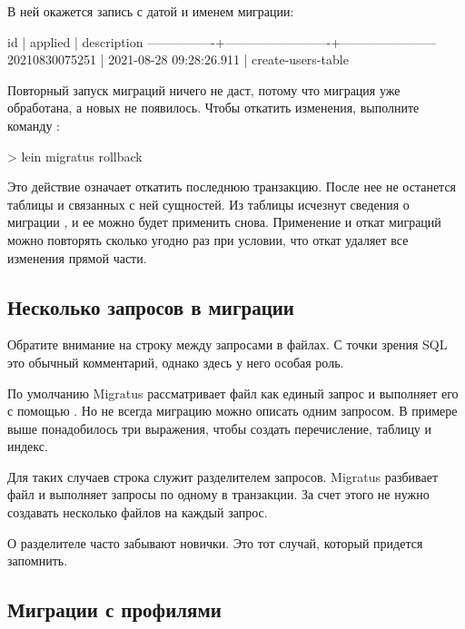 В ней окажется запись с датой и именем миграции:

\begin{english}
  \begin{text}
         id     |         applied         |      description
----------------+-------------------------+-----------------------
 20210830075251 | 2021-08-28 09:28:26.911 | create-users-table
  \end{text}
\end{english}

Повторный запуск миграций ничего не даст, потому что миграция  уже обработана, а новых не появилось. Чтобы откатить изменения, выполните команду :

\begin{english}
  \begin{clojure}
> lein migratus rollback
  \end{clojure}
\end{english}

Это действие означает откатить последнюю транзакцию. После нее не останется таблицы  и связанных с ней сущностей. Из таблицы  исчезнут сведения о миграции , и ее можно будет применить снова. Применение и откат миграций можно повторять сколько угодно раз при условии, что откат удаляет все изменения прямой части.

\subsection{Несколько запросов в миграции}

Обратите внимание на строку \code{--;;} между запросами в файлах. С точки зрения SQL это обычный комментарий, однако здесь у него особая роль.

По умолчанию Migratus рассматривает файл как единый запрос и выполняет его с помощью . Но не всегда миграцию можно описать одним запросом. В примере выше понадобилось три выражения, чтобы создать перечисление, таблицу и индекс.

Для таких случаев строка \code{--;;} служит разделителем запросов. Migratus разбивает файл и выполняет запросы по одному в транзакции. За счет этого не нужно создавать несколько файлов на каждый запрос.

О разделителе часто забывают новички. Это тот случай, который придется запомнить.

\subsection{Миграции с профилями}

